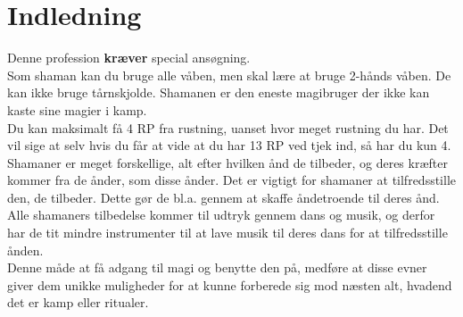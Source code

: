 \chapter{Indledning}

Denne profession \textbf{kræver} special ansøgning.\\

Som shaman kan du bruge alle våben, men skal lære at bruge 2-hånds våben. De kan ikke bruge tårnskjolde. Shamanen er den eneste magibruger der ikke kan kaste sine magier i kamp.\\
Du kan maksimalt få 4 RP fra rustning, uanset hvor meget rustning du har. Det vil sige at selv hvis du får at vide at du har 13 RP ved tjek ind, så har du kun 4.\\

Shamaner er meget forskellige, alt efter hvilken ånd de tilbeder, og deres kræfter kommer fra de ånder, som disse ånder. Det er vigtigt for shamaner at tilfredsstille den, de tilbeder. Dette gør de bl.a. gennem at skaffe åndetroende til deres ånd. Alle shamaners tilbedelse kommer til udtryk gennem dans og musik, og derfor har de tit mindre instrumenter til at lave musik til deres dans for at tilfredsstille ånden.\\
Denne måde at få adgang til magi og benytte den på, medføre at disse evner giver dem unikke muligheder for at kunne forberede sig mod næsten alt, hvadend det er kamp eller ritualer. 